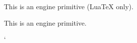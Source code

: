 \begin{function}[]
  {
    \capitaltilde
  }
  \begin{syntax}
  \end{syntax}

\end{function}



\begin{function}[]
  {
    \cases
  }
  \begin{syntax}
  \end{syntax}

\end{function}



\begin{function}[]
  {
    \catcodetable
  }
  \begin{syntax}
  \end{syntax}
  This is an engine primitive (Lua\TeX{} only).
\end{function}



\begin{function}[]
  {
    \ch@ck
  }
  \begin{syntax}
  \end{syntax}

\end{function}



\begin{function}[]
  {
    \char
  }
  \begin{syntax}
  \end{syntax}
  This is an engine primitive.
\end{function}



\begin{function}[]
  {
    \char@if@alph
  }
  \begin{syntax}
  \end{syntax}

\end{function}



\begin{function}[]
  {
    \char`
  }
  \begin{syntax}
  \end{syntax}

\end{function}



